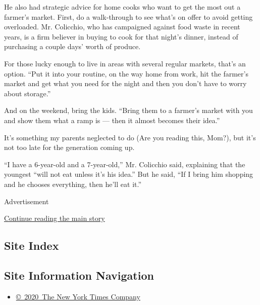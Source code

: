He also had strategic advice for home cooks who want to get the most out
a farmer's market. First, do a walk-through to see what's on offer to
avoid getting overloaded. Mr. Colicchio, who has campaigned against food
waste in recent years, is a firm believer in buying to cook for that
night's dinner, instead of purchasing a couple days' worth of produce.

For those lucky enough to live in areas with several regular markets,
that's an option. ``Put it into your routine, on the way home from work,
hit the farmer's market and get what you need for the night and then you
don't have to worry about storage.''

And on the weekend, bring the kids. ``Bring them to a farmer's market
with you and show them what a ramp is --- then it almost becomes their
idea.''

It's something my parents neglected to do (Are you reading this, Mom?),
but it's not too late for the generation coming up.

``I have a 6-year-old and a 7-year-old,'' Mr. Colicchio said, explaining
that the youngest ``will not eat unless it's his idea.'' But he said,
``If I bring him shopping and he chooses everything, then he'll eat
it.''

Advertisement

\protect\hyperlink{after-bottom}{Continue reading the main story}

\hypertarget{site-index}{%
\subsection{Site Index}\label{site-index}}

\hypertarget{site-information-navigation}{%
\subsection{Site Information
Navigation}\label{site-information-navigation}}

\begin{itemize}
\tightlist
\item
  \href{https://help.nytimes3xbfgragh.onion/hc/en-us/articles/115014792127-Copyright-notice}{©~2020~The
  New York Times Company}
\end{itemize}

